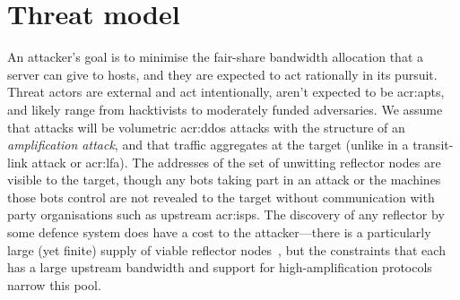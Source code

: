 %

\section{Threat model}\label{sec:ddos-threat}
An attacker's goal is to minimise the fair-share bandwidth allocation that a server can give to hosts, and they are expected to act rationally in its pursuit.
Threat actors are external and act intentionally, aren't expected to be 
\glspl{acr:apt}, and likely range from hacktivists to moderately funded adversaries.
We assume that attacks will be volumetric \gls{acr:ddos} attacks with the structure of an \emph{amplification attack}, and that traffic aggregates at the target (unlike in a transit-link attack or \gls{acr:lfa}).
The addresses of the set of unwitting reflector nodes are visible to the target, though any bots taking part in an attack or the machines those bots control are not revealed to the target without communication with  party organisations such as upstream \glspl{acr:isp}.
The discovery of any reflector by some defence system does have a cost to the attacker---there is a particularly large (yet finite) supply of viable reflector nodes~\parencite{DBLP:conf/ndss/Rossow14}, but the constraints that each has a large upstream bandwidth and support for high-amplification protocols narrow this pool.

